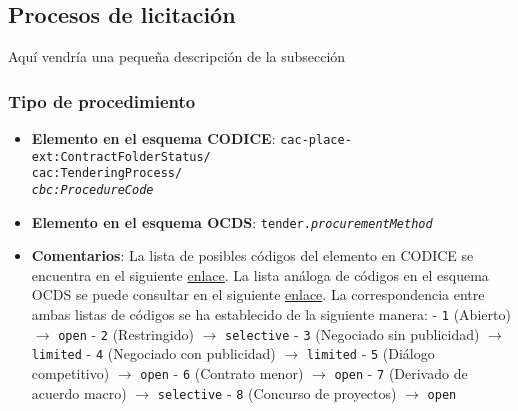     \vspace{0.3cm}

    \subsection{Procesos de licitación}
    
        Aquí vendría una pequeña descripción de la subsección
    
        \subsubsection{Tipo de procedimiento}
            \begin{itemize}
                \item \textbf{Elemento en el esquema CODICE}:
                    \tabto{7.6cm} \texttt{cac-place-ext:ContractFolderStatus/} \\
                    \tabto{7.6cm} \texttt{cac:TenderingProcess/} \\
                    \tabto{7.6cm} \texttt{\textit{cbc:ProcedureCode}}
                \item \textbf{Elemento en el esquema OCDS}:
                    \tabto{7.6cm} \texttt{tender.\textit{procurementMethod}}
                \item \textbf{Comentarios}: La lista de posibles códigos del elemento en CODICE se encuentra en el siguiente 
                    \href{https://contrataciondelestado.es/codice/cl/2.07/SyndicationTenderingProcessCode-2.07.gc}{enlace}.
                    La lista análoga de códigos en el esquema OCDS se puede consultar en el siguiente
                    \href{https://standard.open-contracting.org/latest/es/schema/codelists/#method}{enlace}.
                    La correspondencia entre ambas listas de códigos se ha establecido de la siguiente manera:
                        \subitem - \texttt{1} (Abierto) $\rightarrow$ \texttt{open}
                        \subitem - \texttt{2} (Restringido) $\rightarrow$ \texttt{selective}
                        \subitem - \texttt{3} (Negociado sin publicidad) $\rightarrow$ \texttt{limited}
                        \subitem - \texttt{4} (Negociado con publicidad) $\rightarrow$ \texttt{limited}
                        \subitem - \texttt{5} (Diálogo competitivo) $\rightarrow$ \texttt{open}
                        \subitem - \texttt{6} (Contrato menor) $\rightarrow$ \texttt{open}
                        \subitem - \texttt{7} (Derivado de acuerdo macro) $\rightarrow$ \texttt{selective}
                        \subitem - \texttt{8} (Concurso de proyectos) $\rightarrow$ \texttt{open}

\end{itemize}
